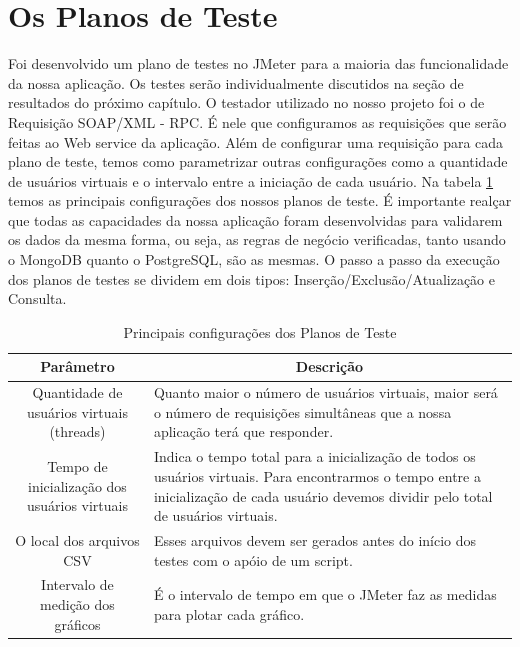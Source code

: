 \section{Os Planos de Teste}

Foi desenvolvido um plano de testes no JMeter para a maioria das funcionalidade da nossa aplicação. Os testes serão individualmente discutidos na seção de resultados do próximo capítulo. O testador utilizado no nosso projeto foi o de Requisição SOAP/XML - RPC. É nele que configuramos as requisições que serão feitas ao Web service da aplicação. Além de configurar uma requisição para cada plano de teste, temos como parametrizar outras configurações como a quantidade de usuários virtuais e o intervalo entre a iniciação de cada usuário. Na tabela \ref{tab:configplanoteste} temos as principais configurações dos nossos planos de teste. É importante realçar que todas as capacidades da nossa aplicação foram desenvolvidas para validarem os dados da mesma forma, ou seja, as regras de negócio verificadas, tanto usando o MongoDB quanto o PostgreSQL, são as mesmas. O passo a passo da execução dos planos de testes se dividem em dois tipos: Inserção/Exclusão/Atualização e Consulta.

\begin{table}
	\caption{Principais configurações dos Planos de Teste}
	\begin{center}
	\begin{tabularx}{\textwidth}{ | c | X | }
	\hline
		\textbf{Parâmetro} & \multicolumn{1}{c|}{\textbf{Descrição}} \\
	\hline
		Quantidade de usuários virtuais (threads) & Quanto maior o número de usuários virtuais, maior será o número de requisições simultâneas que a nossa aplicação terá que responder.\\
	\hline 
		Tempo de inicialização dos usuários virtuais & Indica o tempo total para a inicialização de todos os usuários virtuais. Para encontrarmos o tempo entre a inicialização de cada usuário devemos dividir pelo total de usuários virtuais.\\
	\hline
		O local dos arquivos CSV & Esses arquivos devem ser gerados antes do início dos testes com o apóio de um script.\\
	\hline
		Intervalo de medição dos gráficos & É o intervalo de tempo em que o JMeter faz as medidas para plotar cada gráfico.\\
	\hline
	\end {tabularx}
	\end{center}
	\label{tab:configplanoteste}
\end{table}

